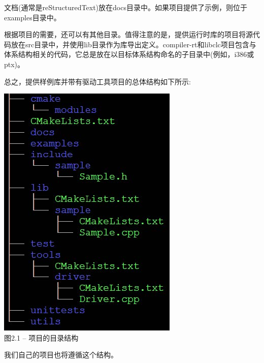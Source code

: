 文档(通常是reStructuredText)放在docs目录中。如果项目提供了示例，则位于examples目录中。\par

根据项目的需要，还可以有其他目录。值得注意的是，提供运行时库的项目将源代码放在src目录中，并使用lib目录作为库导出定义。compiler-rt和libclc项目包含与体系结构相关的代码，它总是放在以目标体系结构命名的子目录中(例如，i386或ptx)。\par

总之，提供样例库并带有驱动工具项目的总体结构如下所示:\par

\hspace*{\fill} \par %
\begin{center}
\includegraphics{content/1/chapter2/images/1.jpg}\\
图2.1 – 项目的目录结构
\end{center}

我们自己的项目也将遵循这个结构。\par









